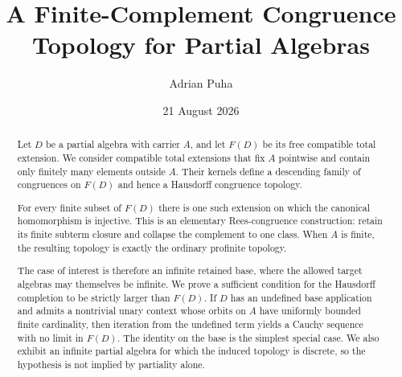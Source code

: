 \documentclass[11pt]{article}
\title{\textbf{A Finite-Complement Congruence Topology for Partial Algebras}}
\author{Adrian Puha}
\date{21 August 2026}
\begin{document}
\maketitle

\begin{abstract}
Let $D$ be a partial algebra with carrier $A$, and let $F(D)$ be its free
compatible total extension.  We consider compatible total extensions that fix
$A$ pointwise and contain only finitely many elements outside $A$.  Their
kernels define a descending family of congruences on $F(D)$ and hence a
Hausdorff congruence topology.

For every finite subset of $F(D)$ there is one such extension on which the
canonical homomorphism is injective.  This is an elementary Rees-congruence
construction: retain its finite subterm closure and collapse the complement to
one class.  When $A$ is finite, the resulting topology is exactly the ordinary
profinite topology.

The case of interest is therefore an infinite retained base, where the allowed
target algebras may themselves be infinite.  We prove a sufficient condition
for the Hausdorff completion to be strictly larger than $F(D)$.  If $D$ has an
undefined base application and admits a nontrivial unary context whose orbits
on $A$ have uniformly bounded finite cardinality, then iteration from the
undefined term yields a Cauchy sequence with no limit in $F(D)$.  The identity
on the base is the simplest special case.  We also exhibit an infinite partial
algebra for which the induced topology is discrete, so the hypothesis is not
implied by partiality alone.
\end{abstract}







\begingroup
\small
\setlength{\bibsep}{0.25em}


\endgroup
\end{document}
